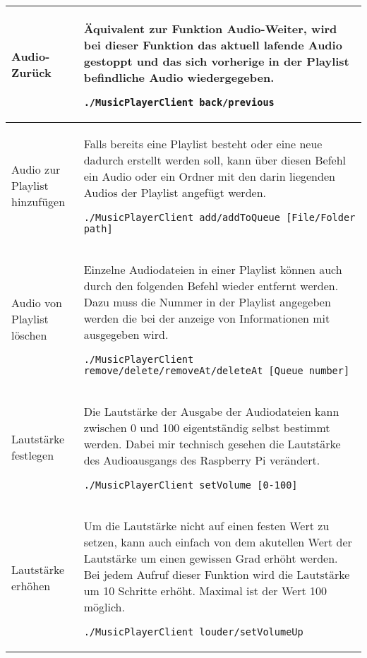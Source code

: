 \begin{longtable}{l|l}
Audio-Zurück & \begin{minipage}[t]{.558\textwidth} Äquivalent zur Funktion Audio-Weiter, wird bei dieser Funktion das aktuell lafende Audio gestoppt und das sich vorherige in der Playlist befindliche Audio wiedergegeben.  \begin{lstlisting}
./MusicPlayerClient back/previous
\end{lstlisting} \end{minipage} \\ \hline

Audio zur Playlist hinzufügen &  \begin{minipage}[t]{.558\textwidth} Falls bereits eine Playlist besteht oder eine neue dadurch erstellt werden soll, kann über diesen Befehl ein Audio oder ein Ordner mit den darin liegenden Audios der Playlist angefügt werden. \begin{lstlisting}
./MusicPlayerClient add/addToQueue [File/Folder path]
\end{lstlisting} \end{minipage} \\ \hline

Audio von Playlist löschen & \begin{minipage}[t]{.558\textwidth} Einzelne Audiodateien in einer Playlist können auch durch den folgenden Befehl wieder entfernt werden. Dazu muss die Nummer in der Playlist angegeben werden die bei der anzeige von Informationen mit ausgegeben wird. \begin{lstlisting}
./MusicPlayerClient remove/delete/removeAt/deleteAt [Queue number]
\end{lstlisting} \end{minipage} \\ \hline

Lautstärke festlegen & \begin{minipage}[t]{.558\textwidth} Die Lautstärke der Ausgabe der Audiodateien kann zwischen 0 und 100 eigentständig selbst bestimmt werden. Dabei mir technisch gesehen die Lautstärke des Audioausgangs des Raspberry Pi verändert. \begin{lstlisting}
./MusicPlayerClient setVolume [0-100]
\end{lstlisting} \end{minipage} \\ \hline

Lautstärke erhöhen & \begin{minipage}[t]{.558\textwidth} Um die Lautstärke nicht auf einen festen Wert zu setzen, kann auch einfach von dem akutellen Wert der Lautstärke um einen gewissen Grad erhöht werden. Bei jedem Aufruf dieser Funktion wird die Lautstärke um 10 Schritte erhöht. Maximal ist der Wert 100 möglich. \begin{lstlisting}
./MusicPlayerClient louder/setVolumeUp
\end{lstlisting} \end{minipage} \\ \hline


\end{longtable}
